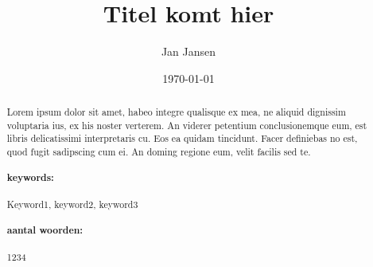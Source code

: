 \title{Titel komt hier}
\author{Jan Jansen}

\date{\small \today}

\maketitle

\begin{abstract}
\noindent Lorem ipsum dolor sit amet, habeo integre qualisque ex mea, ne aliquid dignissim voluptaria ius, ex his noster verterem. An viderer petentium conclusionemque eum, est libris delicatissimi interpretaris cu. Eos ea quidam tincidunt. Facer definiebas no est, quod fugit sadipscing cum ei. An doming regione eum, velit facilis sed te.

\paragraph{keywords:} Keyword1, keyword2, keyword3
\paragraph{aantal woorden:} 1234

\end{abstract}